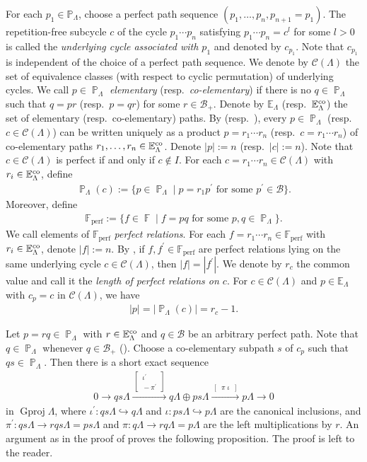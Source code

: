 \documentclass[12pt]{amsart}
\numberwithin{equation}{subsection}
\theoremstyle{plain}
\theoremstyle{definition}
\newcommand{\Gproj}{\operatorname{Gproj}}
\newcommand{\F}{\operatorname{\mathbb{F}}\nolimits}
\newcommand{\Fp}{\mathbb{F}_\text{perf}}
\renewcommand{\P}{\operatorname{\mathbb{P}}\nolimits}
\renewcommand{\L}{\Lambda}
\newcommand{\B}{\mathcal{B}}
\newcommand{\C}{\mathcal{C}}
\newcommand{\Eco}{\mathbb{E}^{\rm co}}
\newcommand{\E}{\mathbb{E}}
\newcommand{\csubstack}[2]{\left[\substack{\,#1\,\\[.5pt]\,#2\,}\right]}
\newcommand{\rsubstack}[2]{\left[\substack{\,#1\hspace{3pt}#2\,}\right]}
\begin{document}
For each $p_1\in\mathbb{P}_\L$, choose a perfect path sequence $(p_{1}, \ldots, p_{n}, p_{n+1} = p_{1})$.
The repetition-free subcycle $c$ of the cycle $p_1 \cdots p_n$ satisfying $p_1 \cdots p_n = c^l$ for some $l>0$ is called the {\it underlying cycle associated with $p_1$} and denoted by $c_{p_1}$. 
Note that $c_{p_1}$ is independent of the choice of a perfect path sequence.
We denote by $\C(\L)$ the set of  equivalence classes (with respect to cyclic permutation) of underlying cycles.
We call $p\in\P_\L$ {\it elementary} (resp.~{\it co-elementary}) if there is no $q\in\P_\L$ such that $q=pr$ (resp.~$p=qr$) for some $r\in\B_+$.
Denote by $\E_\L$ (resp.~$\Eco_\L$) the set of elementary (resp.~co-elementary) paths.
By \cite[Theorem 2.11]{Honma-Usui_2025} (resp.~\cite[Proposition-Definition 2.12]{Honma-Usui_2025}), every $p\in\P_\L$ (resp.~$c\in\C(\L)$) can be written uniquely as a product $p = r_1\cdots r_n$ (resp.~$c = r_1\cdots r_n$) of co-elementary paths $r_1, \ldots, r_n \in \Eco_\L$.
Denote $|p|:=n$ (resp.~$|c|:=n$).
Note that $c\in\C(\L)$ is perfect if and only if $c\not\in I$.
For each $c=r_1 \cdots r_n \in \C(\L)$ with $r_i\in\Eco_\L$, define 
\begin{align}
    \P_\L(c) :=\{p\in\P_\L\mid p= r_1 p^\prime \text{ for some $p^\prime\in\B$}\}.
\end{align}
Moreover, define
\begin{align}
    \Fp :=\{ f \in \F \mid f=pq \text{ for some $p, q \in \P_\L$} \}.
\end{align}
We call elements of $\Fp$ {\it perfect relations}.
For each $f=r_1\cdots r_n \in \Fp$ with $r_i\in\Eco_\L$, denote $|f|:= n$. 
By \cite[Lemma 3.4]{Honma-Usui_2025}, if  $f, f^\prime \in\Fp$ are perfect relations lying on the same underlying cycle $c \in \C(\L)$, then $|f| = |f^\prime|$.
We denote by $r_c$ the common value and call it the {\it length of perfect relations on $c$}. 
For $c\in\C(\L)$ and $p\in\E_\L$ with $c_p = c$ in $\C(\L)$, we have
\begin{align}\label{monomial_eq_1}
    |p| = |\P_\L(c)| = r_c -1.
\end{align}






Let $p=rq \in \P_\L$ with $r \in \Eco_\L$ and $q\in\B$ be an arbitrary perfect path.
Note that $q\in\P_\L$ whenever $q\in\B_+$ (\cite[Proposition 2.5]{Honma-Usui_2025}). 
Choose a co-elementary subpath $s$ of $c_p$ such that $qs\in\P_\L$.
Then there is a short exact sequence 
\begin{align}\label{eq_9}
    0 \to qs\L \xrightarrow{\,\csubstack{\iota^\prime}{-\pi^\prime}\,} q\L \oplus ps\L \xrightarrow{\,\rsubstack{\pi}{\iota}\,} p\L \to 0
\end{align}
in $\Gproj\L$, where $\iota^\prime: qs\L \hookrightarrow q\L$ and $\iota: ps\L \hookrightarrow p\L$ are the canonical inclusions, and $\pi^\prime: qs\L \to rqs\L=ps\L$ and $\pi: q\L \to rq\L =p\L$
are the left multiplications by $r$.
An argument as in the proof of \cite[Proposition 3.10]{Honma-Usui_2025} proves the following proposition.
The proof is left to the reader.
\end{document}
